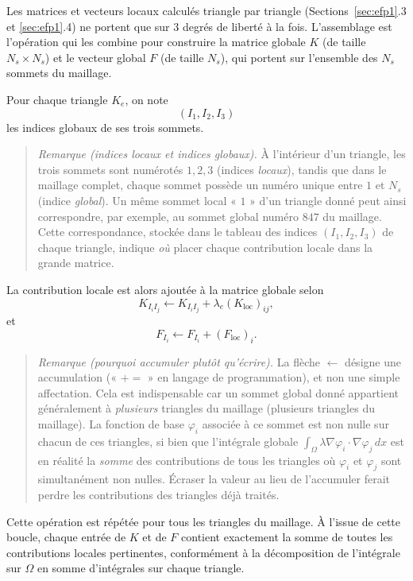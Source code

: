 \documentclass[12pt,a4paper]{article}
\begin{document}
	Les matrices et vecteurs locaux calculés triangle par triangle (Sections~\ref{sec:efp1}.3 et \ref{sec:efp1}.4) ne portent que sur $3$ degrés de liberté à la fois. L'assemblage est l'opération qui les combine pour construire la matrice globale $K$ (de taille $N_s\times N_s$) et le vecteur global $F$ (de taille $N_s$), qui portent sur l'ensemble des $N_s$ sommets du maillage.
	
	Pour chaque triangle $K_e$, on note
	\[
	(I_1,I_2,I_3)
	\]
	les indices globaux de ses trois sommets.
	
	\begin{quote}
		\small\emph{Remarque (indices locaux et indices globaux).} À l'intérieur d'un triangle, les trois sommets sont numérotés $1,2,3$ (indices \emph{locaux}), tandis que dans le maillage complet, chaque sommet possède un numéro unique entre $1$ et $N_s$ (indice \emph{global}). Un même sommet local « $1$ » d'un triangle donné peut ainsi correspondre, par exemple, au sommet global numéro $847$ du maillage. Cette correspondance, stockée dans le tableau des indices $(I_1,I_2,I_3)$ de chaque triangle, indique \emph{où} placer chaque contribution locale dans la grande matrice.
	\end{quote}
	
	La contribution locale est alors ajoutée à la matrice globale selon
	\[
	K_{I_iI_j}
	\leftarrow
	K_{I_iI_j}
	+
	\lambda_e
	(K_{\mathrm{loc}})_{ij},
	\]
	et
	\[
	F_{I_i}
	\leftarrow
	F_{I_i}
	+
	(F_{\mathrm{loc}})_i.
	\]
	
	\begin{quote}
		\small\emph{Remarque (pourquoi accumuler plutôt qu'écrire).} La flèche $\leftarrow$ désigne une accumulation (« $\mathrel{+}=$ » en langage de programmation), et non une simple affectation. Cela est indispensable car un sommet global donné appartient généralement à \emph{plusieurs} triangles du maillage (plusieurs triangles du maillage). La fonction de base $\varphi_i$ associée à ce sommet est non nulle sur chacun de ces triangles, si bien que l'intégrale globale $\int_\Omega\lambda\nabla\varphi_i\cdot\nabla\varphi_j\,dx$ est en réalité la \emph{somme} des contributions de tous les triangles où $\varphi_i$ et $\varphi_j$ sont simultanément non nulles. Écraser la valeur au lieu de l'accumuler ferait perdre les contributions des triangles déjà traités.
	\end{quote}
	
	Cette opération est répétée pour tous les triangles du maillage. À l'issue de cette boucle, chaque entrée de $K$ et de $F$ contient exactement la somme de toutes les contributions locales pertinentes, conformément à la décomposition de l'intégrale sur $\Omega$ en somme d'intégrales sur chaque triangle.
	
\end{document}
